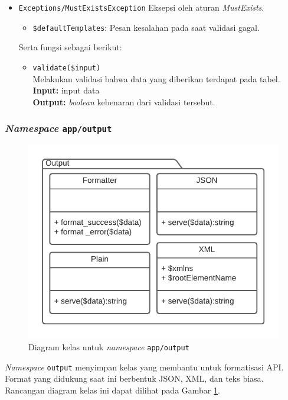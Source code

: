 \begin{itemize}
        \item \texttt{Exceptions/MustExistsException} Eksepsi oleh aturan
            \textit{MustExists}.
            \begin{itemize}
                \item \texttt{\$defaultTemplates}: Pesan kesalahan pada saat
                validasi gagal.
            \end{itemize}
            Serta fungsi sebagai berikut:
            \begin{itemize}
                \item \texttt{validate(\$input)} \\
                    Melakukan validasi bahwa data yang diberikan terdapat pada
                    tabel.\\
                    \textbf{Input:} input data\\
                    \textbf{Output:} \textit{boolean} kebenaran dari validasi
                    tersebut.
            \end{itemize}
    \end{itemize}

\subsubsection{\textit{Namespace} \texttt{app/output}}
    \begin{figure}
        \centering
        \includegraphics{Gambar/classmap-be/Classmap - app-output.pdf}
        \caption{Diagram kelas untuk \textit{namespace} \texttt{app/output}}
        \label{fig:classmap_app-output}
    \end{figure}
    \textit{Namespace} \texttt{output} menyimpan kelas yang membantu untuk
    formatisasi API. Format yang didukung saat ini berbentuk JSON, XML, dan teks
    biasa. Rancangan diagram kelas ini dapat dilihat pada Gambar
    \ref{fig:classmap_app-output}.
    
